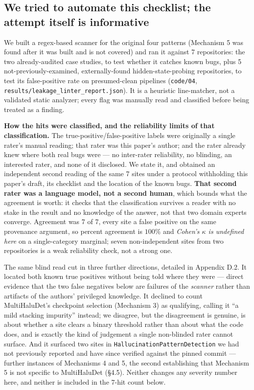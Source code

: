\documentclass[10pt]{article} %
\begin{document}
\subsection{We tried to automate this checklist; the attempt itself is informative}

We built a regex-based scanner for the original four patterns (Mechanism 5 was
found after it was built and is not covered) and ran it against 7 repositories:
the two already-audited case studies, to test whether it catches known bugs,
plus 5 not-previously-examined, externally-found hidden-state-probing
repositories, to test its false-positive rate on presumed-clean pipelines
(\texttt{code/04}, \texttt{results/leakage\_linter\_report.json}). It is a
heuristic line-matcher, not a validated static
analyzer; every flag was manually read and classified before being treated as a
finding.

\textbf{How the hits were classified, and the reliability limits of that
classification.} The true-positive/false-positive labels were originally a
single rater's manual reading; that rater was this paper's author; and the
rater already knew where both real bugs were --- no inter-rater reliability, no
blinding, an interested rater, and none of it disclosed. We state it, and
obtained an independent second reading of the same 7 sites under a protocol
withholding this paper's draft, its checklist and the location of the known
bugs. \textbf{That second rater was a language model, not a second human},
which bounds what the agreement is worth: it checks that the classification
survives a reader with no stake in the result and no knowledge of the answer,
not that two domain experts converge. Agreement was 7 of 7, every site a false
positive on the same provenance argument, so percent agreement is $100\%$ and
\emph{Cohen's $\kappa$ is undefined here} on a single-category marginal; seven
non-independent sites from two repositories is a weak reliability check, not a
strong one.

The same blind read cut in three further directions, detailed in Appendix D.2.
It located both known true positives without being told where they were ---
direct evidence that the two false negatives below are failures of the
\emph{scanner} rather than artifacts of the authors' privileged knowledge. It
declined to count MultiHaluDet's checkpoint selection (Mechanism 3) as
qualifying, calling it ``a mild stacking impurity'' instead; we disagree, but
the disagreement is genuine, is about whether a site clears a binary threshold
rather than about what the code does, and is exactly the kind of judgement a
single non-blinded rater cannot surface. And it surfaced two sites in
\texttt{HallucinationPatternDetection} we had not previously reported and have
since verified against the pinned commit --- further instances of Mechanisms 4
and 5, the second establishing that Mechanism 5 is not specific to MultiHaluDet
(§4.5). Neither changes any severity number here, and neither is included in
the 7-hit count below.
\end{document}
